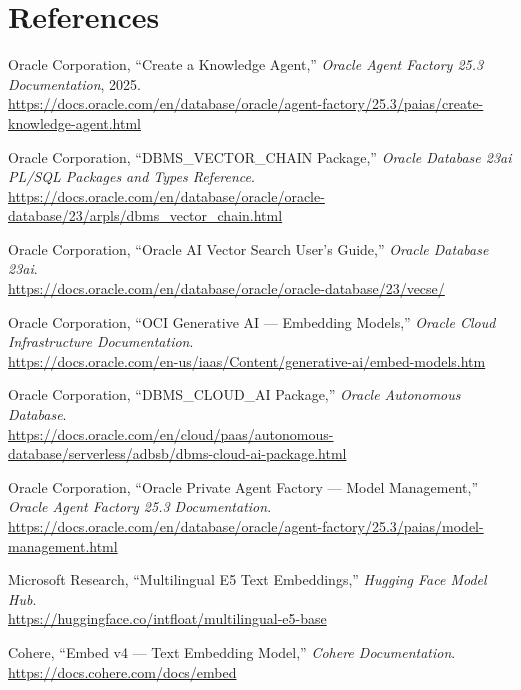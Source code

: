 \documentclass[12pt,a4paper]{article}
\begin{document}
\section{References}
\label{sec:references}

\begin{enumerate}[label={[\arabic*]}]
  \item Oracle Corporation, ``Create a Knowledge Agent,'' \textit{Oracle Agent Factory 25.3 Documentation}, 2025.\\
  \url{https://docs.oracle.com/en/database/oracle/agent-factory/25.3/paias/create-knowledge-agent.html}

  \item Oracle Corporation, ``DBMS\_VECTOR\_CHAIN Package,'' \textit{Oracle Database 23ai PL/SQL Packages and Types Reference}.\\
  \url{https://docs.oracle.com/en/database/oracle/oracle-database/23/arpls/dbms_vector_chain.html}

  \item Oracle Corporation, ``Oracle AI Vector Search User's Guide,'' \textit{Oracle Database 23ai}.\\
  \url{https://docs.oracle.com/en/database/oracle/oracle-database/23/vecse/}

  \item Oracle Corporation, ``OCI Generative AI — Embedding Models,'' \textit{Oracle Cloud Infrastructure Documentation}.\\
  \url{https://docs.oracle.com/en-us/iaas/Content/generative-ai/embed-models.htm}

  \item Oracle Corporation, ``DBMS\_CLOUD\_AI Package,'' \textit{Oracle Autonomous Database}.\\
  \url{https://docs.oracle.com/en/cloud/paas/autonomous-database/serverless/adbsb/dbms-cloud-ai-package.html}

  \item Oracle Corporation, ``Oracle Private Agent Factory — Model Management,'' \textit{Oracle Agent Factory 25.3 Documentation}.\\
  \url{https://docs.oracle.com/en/database/oracle/agent-factory/25.3/paias/model-management.html}

  \item Microsoft Research, ``Multilingual E5 Text Embeddings,'' \textit{Hugging Face Model Hub}.\\
  \url{https://huggingface.co/intfloat/multilingual-e5-base}

  \item Cohere, ``Embed v4 — Text Embedding Model,'' \textit{Cohere Documentation}.\\
  \url{https://docs.cohere.com/docs/embed}
\end{enumerate}
\end{document}
